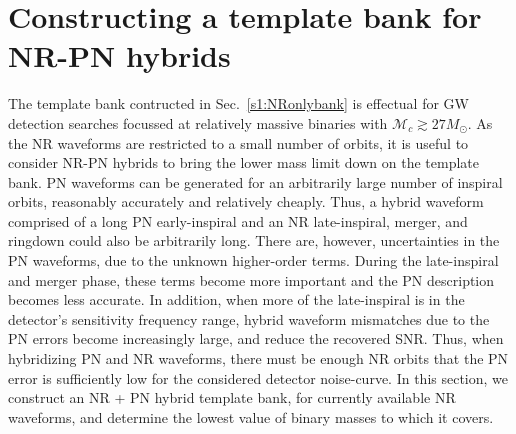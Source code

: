 \documentclass[aps,
prd,
twocolumn,
superscriptaddress,
lengthcheck,showpacs,letterpaper,nofootinbib,
floatfix]{revtex4-1}
\begin{document}
\section{Constructing a template bank for NR-PN hybrids}\label{s1:NRpNhybridbank}

The template bank contructed in Sec.~\ref{s1:NRonlybank} is effectual for 
GW detection searches focussed at relatively massive binaries with 
$\mathcal{M}_c \gtrsim 27M_\odot$. As the NR waveforms are restricted to a
small number of orbits, it is useful to consider NR-PN hybrids to bring the
lower mass limit down on the template bank. PN waveforms can be generated
for an arbitrarily large number of inspiral orbits, reasonably accurately and
relatively cheaply. Thus, a hybrid waveform comprised of a long PN early-inspiral 
and an NR late-inspiral, merger, and ringdown could also be arbitrarily long. 
There are, however, uncertainties in the PN waveforms, due to
the unknown higher-order terms. During the late-inspiral and merger phase,
these terms become more important and the PN description becomes
less accurate. In addition, when more of the late-inspiral is
in the detector's sensitivity frequency range, hybrid waveform mismatches 
due to the PN errors become increasingly large, and reduce the
recovered SNR. Thus, when
hybridizing PN and NR waveforms, there must be enough NR orbits that the PN
error is sufficiently low for the considered detector noise-curve. In 
this section, we construct an NR + PN hybrid template bank, for currently
available NR waveforms, and determine the lowest value of binary masses to 
which it covers.
\end{document}

